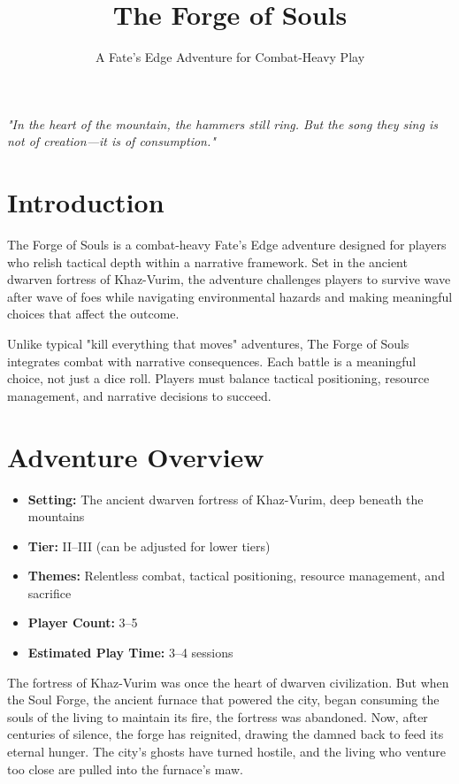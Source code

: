 \documentclass[11pt]{article}
\begin{document}
\title{\textbf{The Forge of Souls}}
\author{A Fate's Edge Adventure for Combat-Heavy Play}
\date{}
\maketitle

\begin{center}
\textit{"In the heart of the mountain, the hammers still ring. But the song they sing is not of creation---it is of consumption."}
\end{center}

\section{Introduction}

The Forge of Souls is a combat-heavy Fate's Edge adventure designed for players who relish tactical depth within a narrative framework. Set in the ancient dwarven fortress of Khaz-Vurim, the adventure challenges players to survive wave after wave of foes while navigating environmental hazards and making meaningful choices that affect the outcome.

Unlike typical "kill everything that moves" adventures, The Forge of Souls integrates combat with narrative consequences. Each battle is a meaningful choice, not just a dice roll. Players must balance tactical positioning, resource management, and narrative decisions to succeed.

\section{Adventure Overview}

\begin{itemize}
    \item \textbf{Setting:} The ancient dwarven fortress of Khaz-Vurim, deep beneath the mountains
    \item \textbf{Tier:} II--III (can be adjusted for lower tiers)
    \item \textbf{Themes:} Relentless combat, tactical positioning, resource management, and sacrifice
    \item \textbf{Player Count:} 3--5
    \item \textbf{Estimated Play Time:} 3--4 sessions
\end{itemize}

The fortress of Khaz-Vurim was once the heart of dwarven civilization. But when the Soul Forge, the ancient furnace that powered the city, began consuming the souls of the living to maintain its fire, the fortress was abandoned. Now, after centuries of silence, the forge has reignited, drawing the damned back to feed its eternal hunger. The city's ghosts have turned hostile, and the living who venture too close are pulled into the furnace's maw.
\end{document}
